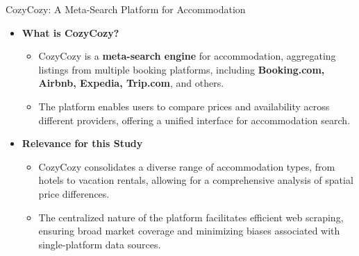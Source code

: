 \documentclass{beamer}
\begin{document}
\begin{frame}{CozyCozy: A Meta-Search Platform for Accommodation}
\begin{itemize}
    \item \textbf{What is CozyCozy?}
    \begin{itemize}
        \item CozyCozy is a \textbf{meta-search engine} for accommodation, aggregating listings from multiple booking platforms, including \textbf{Booking.com, Airbnb, Expedia, Trip.com}, and others.
        \item The platform enables users to compare prices and availability across different providers, offering a unified interface for accommodation search.
    \end{itemize}

    \item \textbf{Relevance for this Study}
    \begin{itemize}
        \item CozyCozy consolidates a diverse range of accommodation types, from hotels to vacation rentals, allowing for a comprehensive analysis of spatial price differences.
        \item The centralized nature of the platform facilitates efficient web scraping, ensuring broad market coverage and minimizing biases associated with single-platform data sources.
    \end{itemize}
\end{itemize}
\end{frame}
\end{document}

